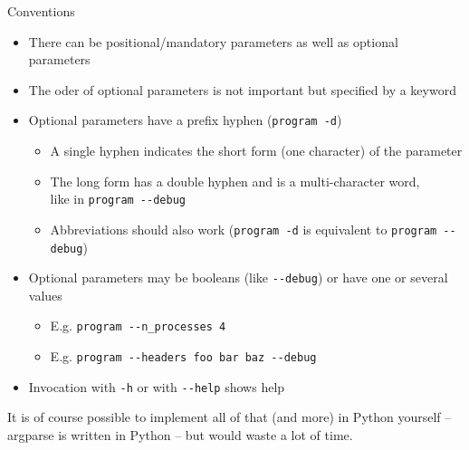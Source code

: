 \begin{frame}{Conventions}
%
\begin{itemize}
\item There can be positional/mandatory parameters as well as optional parameters
\item The oder of optional parameters is not important but specified by a keyword
\item Optional parameters have a prefix hyphen (\zB \texttt{program -d})
	\begin{itemize}
	\item A single hyphen indicates the short form (one character) of the parameter
	\item The long form has a double hyphen and is a multi-character word, \\
		like in \texttt{program -{}-debug}
	\item Abbreviations should also work (\texttt{program -d} is equivalent to \texttt{program -{}-debug})
	\end{itemize}
\item Optional parameters may be booleans (like \texttt{-{}-debug}) or have one or several values
	\begin{itemize}
	\item E.\;g. \texttt{program -{}-n\_processes 4} 
	\item E.\;g. \texttt{program -{}-headers foo bar baz -{}-debug}
	\end{itemize}
\item Invocation with \texttt{-h} or with \texttt{-{}-help} shows help
\end{itemize}
%
\begin{warnbox}
\footnotesize
It is of course possible to implement all of that (and more) in Python yourself -- argparse is written in Python -- but would waste a lot of time.
\end{warnbox}
%
\end{frame}


